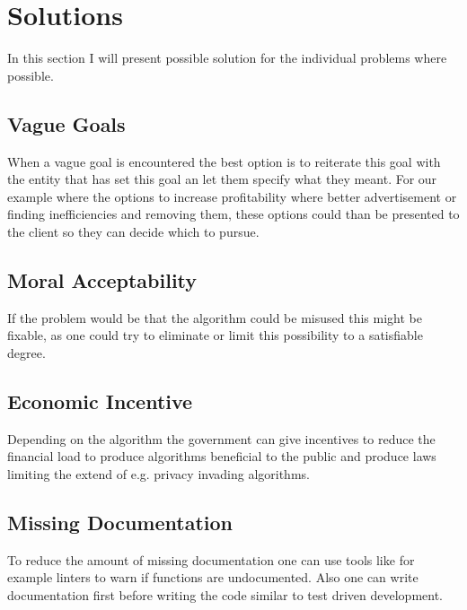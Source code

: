 \section{Solutions}
In this section I will present possible solution
for the individual problems where possible.

\subsection{Vague Goals}
When a vague goal is encountered the best option is to reiterate this goal with the entity that has set this goal an let them specify what they meant. For our example where the options to increase profitability where better advertisement or finding inefficiencies and removing them, these options could than be presented to the client so they can decide which to pursue.


\subsection{Moral Acceptability}
If the problem would be that the algorithm could be misused
this might be fixable, as one could try to eliminate or limit this possibility to a satisfiable degree.

\subsection{Economic Incentive}
Depending on the algorithm the government can
give incentives to reduce the financial load
to produce algorithms beneficial to the public and
produce laws limiting the extend of e.g. privacy invading algorithms.




\subsection{Missing Documentation}
To reduce the amount of missing documentation
one can use tools like for example linters to warn if 
functions are undocumented. Also one can write documentation 
first before writing the code similar to test driven development.


